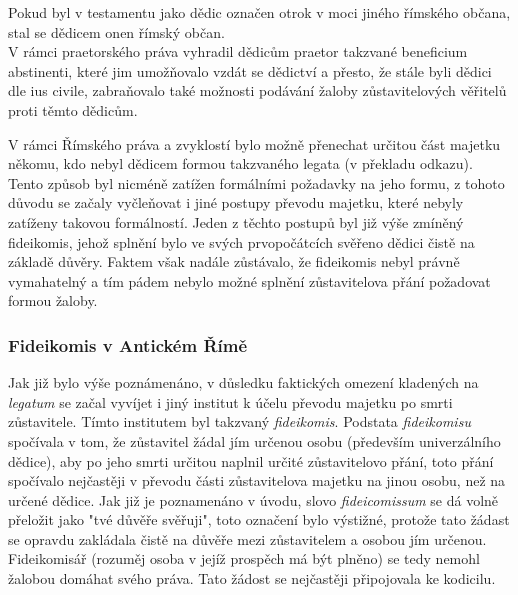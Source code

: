 \documentclass{article}
\begin{document}
\vspace{5 mm}

Pokud byl v testamentu jako dědic označen otrok v moci jiného římského občana, stal se dědicem onen římský občan.  \\

V rámci praetorského práva vyhradil dědicům praetor takzvané beneficium abstinenti, které jim umožňovalo vzdát se dědictví a přesto, že stále byli dědici dle ius civile, zabraňovalo také možnosti podávání žaloby zůstavitelových věřitelů proti těmto dědicům.

\newpage

V rámci Římského práva a zvyklostí bylo možně přenechat určitou část majetku někomu, kdo nebyl dědicem formou takzvaného legata (v překladu odkazu). Tento způsob byl nicméně zatížen formálními požadavky na jeho formu, z tohoto důvodu se začaly vyčleňovat i jiné postupy převodu majetku, které nebyly zatíženy takovou formálností. Jeden z těchto postupů byl již výše zmíněný fideikomis, jehož splnění bylo ve svých prvopočátcích svěřeno dědici čistě na základě důvěry. Faktem však nadále zůstávalo, že fideikomis nebyl právně vymahatelný a tím pádem nebylo možné splnění zůstavitelova přání požadovat formou žaloby.

\subsubsection{Fideikomis v Antickém Římě}

Jak již bylo výše poznámenáno, v důsledku faktických omezení kladených na \textit{legatum} se začal vyvíjet i jiný institut k účelu převodu majetku po smrti zůstavitele. Tímto institutem byl takzvaný \textit{fideikomis}. Podstata \textit{fideikomisu} spočívala v tom, že zůstavitel žádal jím určenou osobu (především univerzálního dědice), aby po jeho smrti určitou naplnil určité zůstavitelovo přání, toto přání spočívalo nejčastěji v převodu části zůstavitelova majetku na jinou osobu, než na určené dědice. Jak již je poznamenáno v úvodu, slovo \textit{fideicomissum} se dá volně přeložit jako "tvé důvěře svěřuji", toto označení bylo výstižné, protože tato žádast se opravdu zakládala čistě na důvěře mezi zůstavitelem a osobou jím určenou. Fideikomisář (rozuměj osoba v jejíž prospěch má být plněno) se tedy nemohl žalobou domáhat svého práva. Tato žádost se nejčastěji připojovala ke kodicilu. \\
\end{document}
